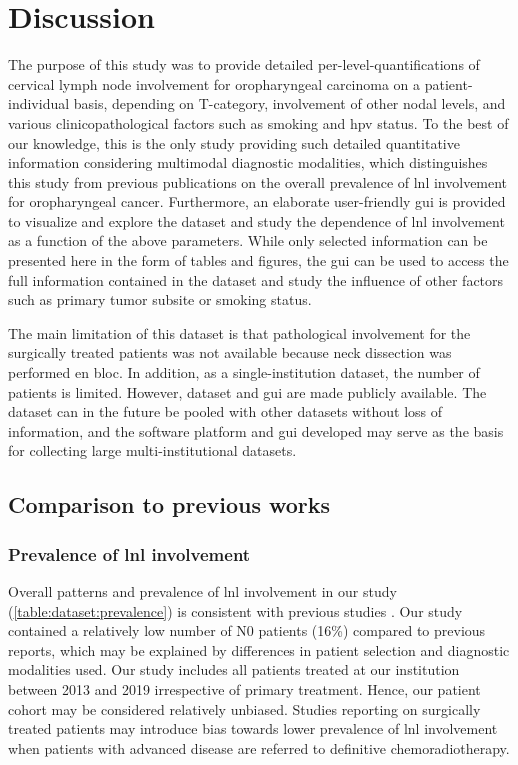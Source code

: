 \documentclass[\relativeRoot/main.tex]{subfiles}
\begin{document}
\section{Discussion}
\label{sec:dataset:discussion}

The purpose of this study was to provide detailed per-level-quantifications of cervical lymph node involvement for oropharyngeal carcinoma on a patient-individual basis, depending on T-category, involvement of other nodal levels, and various clinicopathological factors such as smoking and \gls{hpv} status. To the best of our knowledge, this is the only study providing such detailed quantitative information considering multimodal diagnostic modalities, which distinguishes this study from previous publications on the overall prevalence of \gls{lnl} involvement for oropharyngeal cancer. Furthermore, an elaborate user-friendly \gls{gui} is provided to visualize and explore the dataset and study the dependence of \gls{lnl} involvement as a function of the above parameters. While only selected information can be presented here in the form of tables and figures, the \gls{gui} can be used to access the full information contained in the dataset and study the influence of other factors such as primary tumor subsite or smoking status.

The main limitation of this dataset is that pathological involvement for the surgically treated patients was not available because neck dissection was performed en bloc. In addition, as a single-institution dataset, the number of patients is limited. However, dataset and \gls{gui} are made publicly available. The dataset can in the future be pooled with other datasets without loss of information, and the software platform and \gls{gui} developed may serve as the basis for collecting large multi-institutional datasets.

\subsection*{Comparison to previous works}

\subsubsection*{Prevalence of \gls{lnl} involvement}

Overall patterns and prevalence of \gls{lnl} involvement in our study (\cref{table:dataset:prevalence}) is consistent with previous studies \cite{candela_patterns_1990,gregoire_selection_2000,iyizoba-ebozue_retropharyngeal_2020}. Our study contained a relatively low number of N0 patients (16\%) compared to previous reports, which may be explained by differences in patient selection and diagnostic modalities used. Our study includes all patients treated at our institution between 2013 and 2019 irrespective of primary treatment. Hence, our patient cohort may be considered relatively unbiased. Studies reporting on surgically treated patients may introduce bias towards lower prevalence of \gls{lnl} involvement when patients with advanced disease are referred to definitive chemoradiotherapy.
\end{document}
